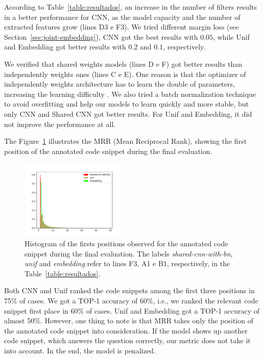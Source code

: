 \documentclass[sigconf]{acmart}
\begin{document}
According to Table~\ref{table:resultados}, an increase in the number of filters results in a better performance for CNN, as the model capacity and the number of extracted features grow (lines D3 e F3). 
We tried different margin loss (see Section~\ref{sec:joint-embedding}), CNN got the best results with  $0.05$, while Unif and Embedding got better results with $0.2$ and $0.1$, respectively. 


We verified that shared weights models (lines D e F) got better results than independently weights ones (lines C e E). One reason is that the optimizer of independently weights architecture has to learn the double of parameters, increasing the learning difficulty \cite{feng-2015}. We also tried a batch normalization technique to avoid overfitting and help our models to learn quickly and more stable, but only CNN and Shared CNN got better results. For Unif and Embedding, it did not improve the performance at all. 

The Figure~\ref{fig:histogram-mrr} illustrates the MRR (Mean Reciprocal Rank), showing the first position of the annotated code snippet during the final evaluation.

\begin{figure}[H]
    \centering
    \includegraphics[width=0.45\textwidth]{figuras/histogram.pdf}
    \caption{Histogram of the firsts positions observed for the annotated code snippet during the final evaluation. The labels \emph{shared-cnn-with-bn}, \emph{unif} and \emph{embedding} refer to lines F3, A1 e B1, respectively, in the Table~\ref{table:resultados}.}
    \label{fig:histogram-mrr}
\end{figure}


Both CNN and Unif ranked the code snippets among the first three positions in 75\% of cases. We got a TOP-1 accuracy of 60\%, i.e., we ranked the relevant code snippet first place in 60\% of cases. Unif and Embedding got a TOP-1 accuracy of almost 50\%. However, one thing to note is that MRR takes only the position of the annotated code snippet into consideration. If the model shows up another code snippet, which answers the question correctly, our metric does not take it into account. In the end, the model is penalized. 
\end{document}
